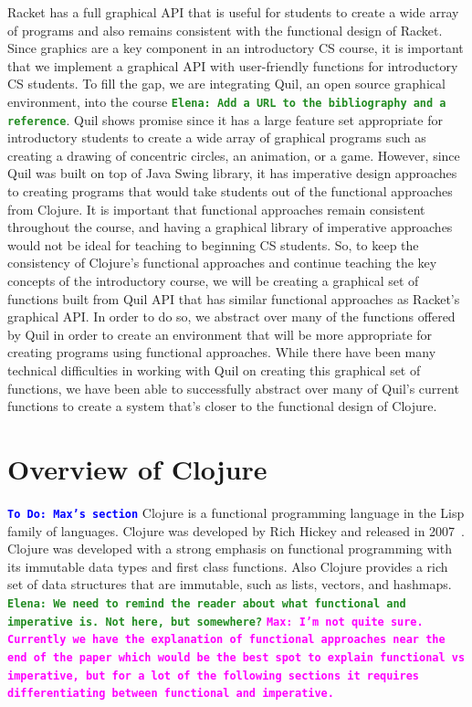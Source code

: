 \documentclass[12pt]{article}
\newcommand{\comment}[1]{{\bf \tt  {#1}}}
\newcommand{\emcomment}[1]{\textcolor{ForestGreen}{\comment{Elena: {#1}}}}
\newcommand{\todo}[1]{\textcolor{blue}{\comment{To Do: {#1}}}}
\newcommand{\mmcomment}[1]{\textcolor{magenta}{\comment{Max: {#1}}}}
\begin{document}
Racket has a full graphical API that is useful for students to create a wide array of programs and also remains consistent with the functional design of Racket. Since graphics are a key component in an introductory CS course, it is important that we implement a graphical API with user-friendly functions for introductory CS students. To fill the gap, we are integrating Quil, an open source graphical environment, into the course \emcomment{Add a URL to the bibliography and a reference}. Quil shows promise since it has a large feature set appropriate for introductory students to create a wide array of graphical programs such as creating a drawing of concentric circles, an animation, or a game. However, since Quil was built on top of Java Swing library, it has imperative design approaches to creating programs that would take students out of the functional approaches from Clojure. It is important that functional approaches remain consistent throughout the course, and having a graphical library of imperative approaches would not be ideal for teaching to beginning CS students. So, to keep the consistency of Clojure's functional approaches and continue teaching the key concepts of the introductory course, we will be creating a graphical set of functions built from Quil API that has similar functional approaches as Racket's graphical API. In order to do so, we abstract over many of the functions offered by Quil in order to create an environment that will be more appropriate for creating programs using functional approaches. While there have been many technical difficulties in working with Quil on creating this graphical set of functions, we have been able to successfully abstract over many of Quil's current functions to create a system that’s closer to the functional design of Clojure.

\section{Overview of Clojure}\label{sec:clojure}
\todo{Max's section}
Clojure is a functional programming language in the Lisp family of languages. Clojure was developed by Rich Hickey and released in 2007~\cite{Hickey:2008}. Clojure was developed with a strong emphasis on functional programming with its immutable data types and first class functions. Also Clojure provides a rich set of data structures that are immutable, such as lists, vectors, and hashmaps.
\emcomment{We need to remind the reader about what functional and imperative is. Not here, but somewhere?}
\mmcomment{I'm not quite sure. Currently we have the explanation of functional approaches near the end of the paper which would be the best spot to explain functional vs imperative, but for a lot of the following sections it requires differentiating between functional and imperative.}
\end{document}
